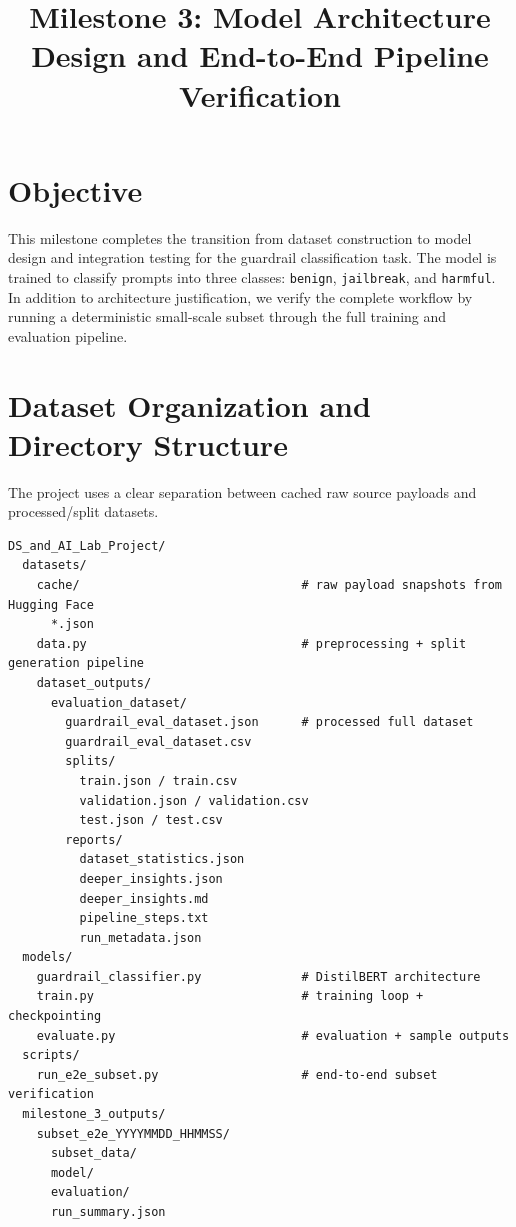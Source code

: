 \documentclass[11pt]{article}
\begin{document}
\title{\textbf{Milestone 3: Model Architecture Design and End-to-End Pipeline Verification}}
\date{}
\maketitle
\onehalfspacing

\section{Objective}
This milestone completes the transition from dataset construction to model design and integration testing for the guardrail classification task. The model is trained to classify prompts into three classes: \texttt{benign}, \texttt{jailbreak}, and \texttt{harmful}. In addition to architecture justification, we verify the complete workflow by running a deterministic small-scale subset through the full training and evaluation pipeline.

\section{Dataset Organization and Directory Structure}
The project uses a clear separation between cached raw source payloads and processed/split datasets.

\begin{verbatim}
DS_and_AI_Lab_Project/
  datasets/
    cache/                               # raw payload snapshots from Hugging Face
      *.json
    data.py                              # preprocessing + split generation pipeline
    dataset_outputs/
      evaluation_dataset/
        guardrail_eval_dataset.json      # processed full dataset
        guardrail_eval_dataset.csv
        splits/
          train.json / train.csv
          validation.json / validation.csv
          test.json / test.csv
        reports/
          dataset_statistics.json
          deeper_insights.json
          deeper_insights.md
          pipeline_steps.txt
          run_metadata.json
  models/
    guardrail_classifier.py              # DistilBERT architecture
    train.py                             # training loop + checkpointing
    evaluate.py                          # evaluation + sample outputs
  scripts/
    run_e2e_subset.py                    # end-to-end subset verification
  milestone_3_outputs/
    subset_e2e_YYYYMMDD_HHMMSS/
      subset_data/
      model/
      evaluation/
      run_summary.json
\end{verbatim}
\end{document}
